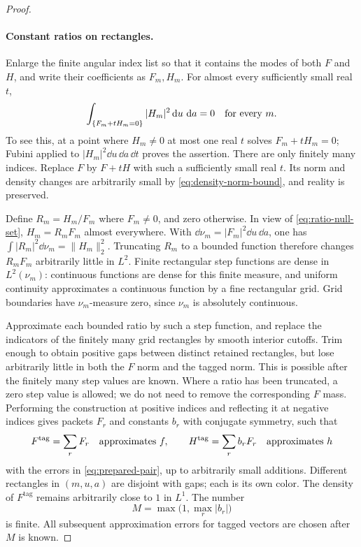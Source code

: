 \begin{proof}
\paragraph{Constant ratios on rectangles.}
Enlarge the finite angular index list so that it contains the modes of
both $F$ and $H$, and write their coefficients as $F_m,H_m$.  For almost
every sufficiently small real $t$,
\begin{equation}\label{eq:ratio-null-set}
 \int_{\{F_m+tH_m=0\}}|H_m|^2\,\mathrm d u\,\,\mathrm d a=0
 \quad\hbox{for every }m.
\end{equation}
To see this, at a point where $H_m\ne0$ at most one real $t$ solves
$F_m+tH_m=0$; Fubini applied to $|H_m|^2\dd u\,\dd a\,\dd t$ proves
the assertion.  There are only finitely many indices.  Replace $F$ by
$F+tH$ with such a sufficiently small real $t$.  Its norm and density
changes are arbitrarily small by \eqref{eq:density-norm-bound}, and
reality is preserved.

Define $R_m=H_m/F_m$ where $F_m\ne0$, and zero otherwise.  In view of
\eqref{eq:ratio-null-set}, $H_m=R_mF_m$ almost everywhere.  With
$\dd\nu_m=|F_m|^2\dd u\,\dd a$, one has
$\int|R_m|^2\dd\nu_m=\|H_m\|_2^2$.  Truncating $R_m$ to a bounded
function therefore changes $R_mF_m$ arbitrarily little in $L^2$.
Finite rectangular step functions are dense in $L^2(\nu_m)$: continuous
functions are dense for this finite measure, and uniform continuity
approximates a continuous function by a fine rectangular grid.  Grid
boundaries have $\nu_m$-measure zero, since $\nu_m$ is absolutely
continuous.

Approximate each bounded ratio by such a step function, and replace the
indicators of the finitely many grid rectangles by smooth interior
cutoffs.  Trim enough to obtain positive gaps between distinct retained
rectangles, but lose arbitrarily little in both the $F$ norm and the
tagged norm.  This is possible after the finitely many step values are
known.  Where a ratio has been truncated, a zero step value is allowed;
we do not need to remove the corresponding $F$ mass.  Performing the
construction at positive indices and reflecting it at negative indices
gives packets $F_r$ and constants $b_r$ with conjugate symmetry, such
that
\[
 F^{\mathrm{tag}}=\sum_r F_r\quad\hbox{approximates }f,
 \qquad
 H^{\mathrm{tag}}=\sum_r b_rF_r\quad\hbox{approximates }h
\]
with the errors in \eqref{eq:prepared-pair}, up to arbitrarily small
additions.  Different rectangles in $(m,u,a)$ are disjoint with gaps;
each is its own color.  The density of $F^{\mathrm{tag}}$ remains
arbitrarily close to $1$ in $L^1$.  The number
\[
 M=\max\bigl(1,\max_r|b_r|\bigr)
\]
is finite.  All subsequent approximation errors for tagged vectors are
chosen after $M$ is known.


\end{proof}
